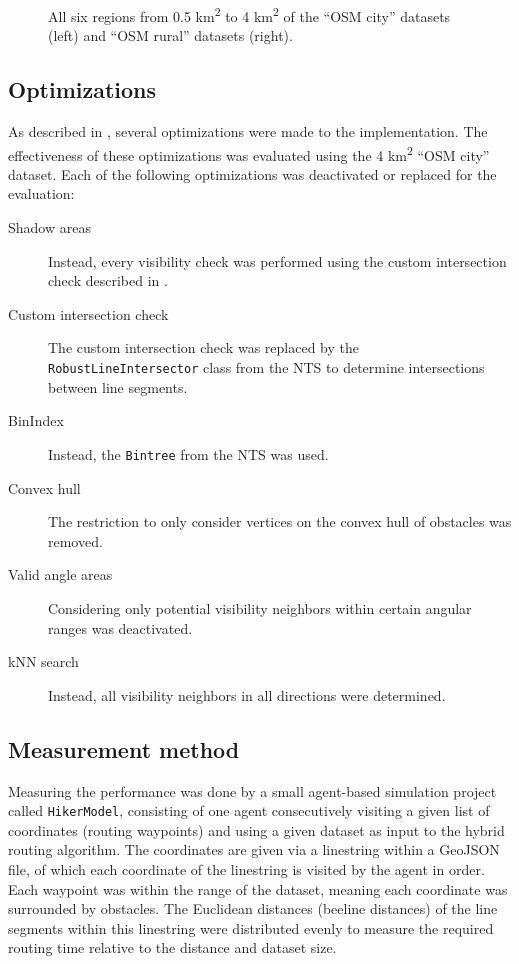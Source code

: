 \begin{figure}[h!]
\begin{minipage}[t]{.38\textwidth}
\begin{figcenter}
				\end{figcenter}
			\end{minipage}
			\caption[Areas of the \enquote{OSM city} and \enquote{OSM rural} datasets.]{All six regions from 0.5 km\textsuperscript{2} to 4 km\textsuperscript{2} of the \enquote{OSM city} datasets (left) and \enquote{OSM rural} datasets (right).}
		\end{figure}
	
	\subsection{Optimizations}
	
		As described in , several optimizations were made to the implementation.
		The effectiveness of these optimizations was evaluated using the 4 km\textsuperscript{2} \enquote{OSM city} dataset.
		Each of the following optimizations was deactivated or replaced for the evaluation:

		\begin{description}
			\item[Shadow areas] Instead, every visibility check was performed using the custom intersection check described in .
			\item[Custom intersection check] The custom intersection check was replaced by the \texttt{RobustLineIntersector} class from the NTS to determine intersections between line segments.
			\item[BinIndex] Instead, the \texttt{Bintree} from the NTS was used.
			\item[Convex hull] The restriction to only consider vertices on the convex hull of obstacles was removed.
			\item[Valid angle areas] Considering only potential visibility neighbors within certain angular ranges was deactivated.
			\item[kNN search] Instead, all visibility neighbors in all directions were determined.
		\end{description}		
		
	\subsection{Measurement method}
	
		Measuring the performance was done by a small agent-based simulation project called \texttt{HikerModel}, consisting of one agent consecutively visiting a given list of coordinates (routing waypoints) and using a given dataset as input to the hybrid routing algorithm.
		The coordinates are given via a linestring within a GeoJSON file, of which each coordinate of the linestring is visited by the agent in order.
		Each waypoint was within the range of the dataset, meaning each coordinate was surrounded by obstacles.
		The Euclidean distances (beeline distances) of the line segments within this linestring were distributed evenly to measure the required routing time relative to the distance and dataset size.
		
